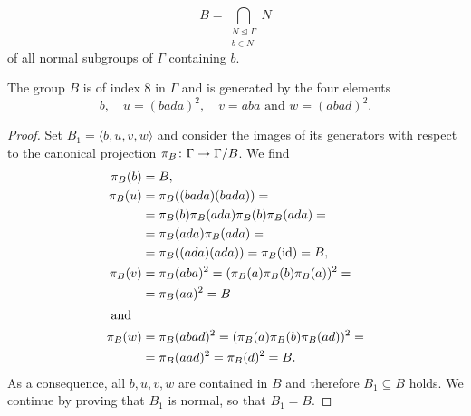 \begin{equation*}
B=\bigcap_{\substack{N\unlhd\Gamma\\b\in N}}N
\end{equation*}
of all normal subgroups of $\Gamma$ containing $b$.
\begin{lem}\label{thm:B}
The group $B$ is of index $8$ in $\Gamma$ and is generated by the four elements
\begin{equation*}
b,\quad u=(bada)^2,\quad v=aba \text{ and } w=(abad)^2.
\end{equation*}
\end{lem}
\begin{proof}
Set $B_1=\langle b,u,v,w\rangle$ and consider the images of its generators with respect to the canonical projection $\pi_B\colon\Gamma\to\nicefrac{\Gamma}{B}$. We find
\begin{align*}
\pi_B(b)&=B,\\
\pi_B(u)	&=\pi_B((bada)(bada))=\\
				&=\pi_B(b)\pi_B(ada)\pi_B(b)\pi_B(ada)=\\
				&=\pi_B(ada)\pi_B(ada)=\\
				&=\pi_B((ada)(ada))=\pi_B(\id)=B,\\
\pi_B(v)	&=\pi_B(aba)^2=(\pi_B(a)\pi_B(b)\pi_B(a))^2=\\
				&=\pi_B(aa)^2=B \\
\intertext{ and}
\pi_B(w)	&=\pi_B(abad)^2=(\pi_B(a)\pi_B(b)\pi_B(ad))^2=\\
		&=\pi_B(aad)^2=\pi_B(d)^2=B.
\end{align*}
As a consequence, all $b,u,v,w$ are contained in $B$ and therefore $B_1\subseteq B$ holds. We continue by proving that $B_1$ is normal, so that $B_1=B$.


\end{proof}

